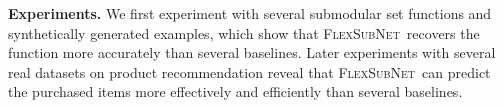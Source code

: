 \documentclass{article}
\newcommand{\our}{\textsc{Flex\-Sub\-Net}}
\newcommand{\xhdr}[1]{\noindent\textbf{#1.}}
\renewcommand{\cite}{\citep}
\begin{document}

\xhdr{Experiments}
We first experiment with several submodular set functions and synthetically generated examples, which show that
\our\ recovers the function more accurately than several baselines.  Later experiments with several real datasets on product recommendation reveal that \our\ can predict the purchased items more effectively and efficiently than several  baselines.
\end{document}
